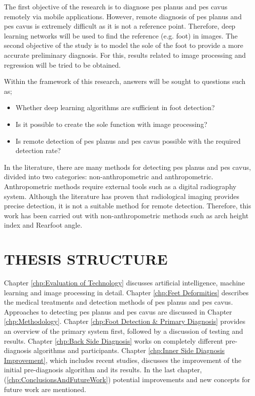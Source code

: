 The first objective of the research is to diagnose pes planus and pes cavus remotely via mobile applications. However, remote diagnosis of pes planus and pes cavus is extremely difficult as it is not a reference point. Therefore, deep learning networks will be used to find the reference (e.g. foot) in images. The second objective of the study is to model the sole of the foot to provide a more accurate preliminary diagnosis. For this, results related to image processing and regression will be tried to be obtained.

Within the framework of this research, answers will be sought to questions such as;

\begin{itemize}
  \item Whether deep learning algorithms are sufficient in foot detection?
  \item Is it possible to create the sole function with image processing?
  \item Is remote detection of pes planus and pes cavus possible with the required detection rate?
\end{itemize}

In the literature, there are many methods for detecting pes planus and pes cavus, divided into two categories: non-anthropometric and anthropometric. Anthropometric methods require external tools such as a digital radiography system. Although the literature has proven that radiological imaging provides precise detection, it is not a suitable method for remote detection. Therefore, this work has been carried out with non-anthropometric methods such as arch height index and Rearfoot angle.

\section{THESIS STRUCTURE}

Chapter \ref{chp:Evaluation of Technology} discusses artificial intelligence, machine learning and image processing in detail. Chapter \ref{chp:Feet Deformities} describes the medical treatments and detection methods of pes planus and pes cavus. Approaches to detecting pes planus and pes cavus are discussed in Chapter \ref{chp:Methodology}. Chapter \ref{chp:Foot Detection & Primary Diagnosis} provides an overview of the primary system first, followed by a discussion of testing and results. Chapter \ref{chp:Back Side Diagnosis} works on completely different pre-diagnosis algorithms and participants. Chapter \ref{chp:Inner Side Diagnosis Improvement}, which includes recent studies, discusses the improvement of the initial pre-diagnosis algorithm and its results. In the last chapter, (\ref{chp:ConclusionsAndFutureWork}) potential improvements and new concepts for future work are mentioned.
